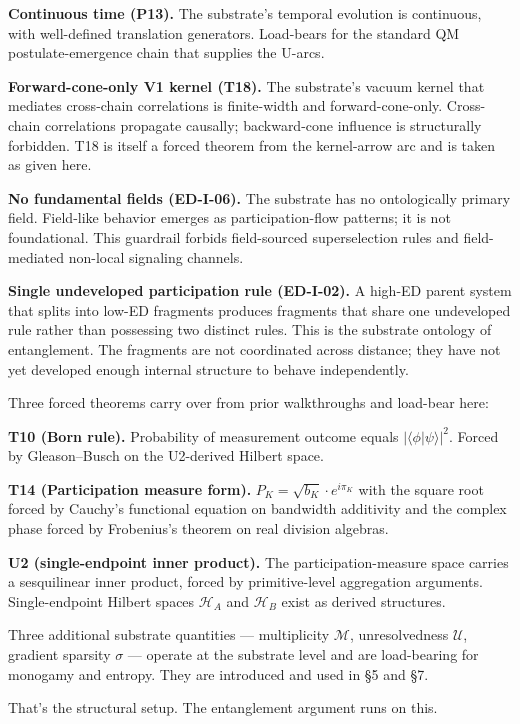 \documentclass[11pt,a4paper]{article}
\begin{document}
\textbf{Continuous time (P13).} The substrate's temporal evolution is continuous, with well-defined translation generators. Load-bears for the standard QM postulate-emergence chain that supplies the U-arcs.

\textbf{Forward-cone-only V1 kernel (T18).} The substrate's vacuum kernel that mediates cross-chain correlations is finite-width and forward-cone-only. Cross-chain correlations propagate causally; backward-cone influence is structurally forbidden. T18 is itself a forced theorem from the kernel-arrow arc and is taken as given here.

\textbf{No fundamental fields (ED-I-06).} The substrate has no ontologically primary field. Field-like behavior emerges as participation-flow patterns; it is not foundational. This guardrail forbids field-sourced superselection rules and field-mediated non-local signaling channels.

\textbf{Single undeveloped participation rule (ED-I-02).} A high-ED parent system that splits into low-ED fragments produces fragments that share one undeveloped rule rather than possessing two distinct rules. This is the substrate ontology of entanglement. The fragments are not coordinated across distance; they have not yet developed enough internal structure to behave independently.

Three forced theorems carry over from prior walkthroughs and load-bear here:

\textbf{T10 (Born rule).} Probability of measurement outcome equals $|\langle\phi|\psi\rangle|^2$. Forced by Gleason--Busch on the U2-derived Hilbert space.

\textbf{T14 (Participation measure form).} $P_K = \sqrt{b_K} \cdot e^{i\pi_K}$ with the square root forced by Cauchy's functional equation on bandwidth additivity and the complex phase forced by Frobenius's theorem on real division algebras.

\textbf{U2 (single-endpoint inner product).} The participation-measure space carries a sesquilinear inner product, forced by primitive-level aggregation arguments. Single-endpoint Hilbert spaces $\mathcal{H}_A$ and $\mathcal{H}_B$ exist as derived structures.

Three additional substrate quantities --- multiplicity $\mathcal{M}$, unresolvedness $\mathcal{U}$, gradient sparsity $\sigma$ --- operate at the substrate level and are load-bearing for monogamy and entropy. They are introduced and used in \S5 and \S7.

That's the structural setup. The entanglement argument runs on this.
\end{document}
